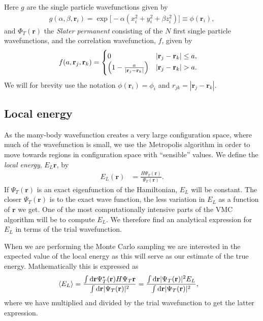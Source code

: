\documentclass[
    a4paper, aps, twocolumn, floatfix, superscriptaddress, nofootinbib]{revtex4-1}
\newcommand{\vf}{\mathbf}
\newcommand{\1}{\mathds{1}}
\begin{document}
    Here $g$ are the single particle wavefunctions given by
    \begin{align}
        g(\alpha, \beta, \vf{r}_i)
        = \exp\bigl[
            -\alpha(x_i^2 + y_i^2 + \beta z_i^2)
        \bigr] \equiv \phi(\vf{r}_i),
    \end{align}
    and $\Phi_T(\vf{r})$ the \textit{Slater permanent} consisting of the $N$
    first single particle wavefunctions, and the correlation wavefunction, $f$,
    given by
    \begin{align}
        f(a, \vf{r}_j, \vf{r}_k)
        &=
        \begin{cases}
            0 & |\vf{r}_j - \vf{r}_k| \leq a, \\
            \Bigl(
                1 - \frac{a}{|\vf{r}_j - \vf{r}_k|}
            \Bigr) & |\vf{r}_j - \vf{r}_k| > a.
        \end{cases}
    \end{align}
    We will for brevity use the notation $\phi(\vf{r}_i) = \phi_i$ and $r_{jk} =
    |\vf{r}_j - \vf{r}_k|$.

    \subsection{Local energy}
        As the many-body wavefunction creates a very large configuration space,
        where much of the wavefunction is small, we use the Metropolis algorithm
        in order to move towards regions in configuration space with
        ``sensible'' values. We define the \textit{local energy}, $E_L{\vf{r}}$,
        by
        \begin{align}
            E_L(\vf{r})
            &= \frac{H\Psi_T(\vf{r})}{\Psi_T(\vf{r})}.
        \end{align}
        If $\Psi_T(\vf{r})$ is an exact eigenfunction of the Hamiltonian, $E_L$
        will be constant. The closer $\Psi_T(\vf{r})$ is to the exact wave
        function, the less variation in $E_L$ as a function of $\vf{r}$ we get.
        One of the most computationally intensive parts of the VMC algorithm
        will be to compute $E_L$. We therefore find an analytical expression for
        $E_L$ in terms of the trial wavefunction.

        When we are performing the Monte Carlo sampling we are interested in the
        expected value of the local energy as this will serve as our estimate of
        the true energy. Mathematically this is expressed as
        \begin{align}
            \expval{E_L}
            &=
            \frac{\int\dd \vf{r}\Psi_T^{*}(\vf{r})H\Psi_T{\vf{r}}}
            {\int\dd \vf{r}|\Psi_T(\vf{r})|^2}
            =
            \frac{
                \int\dd \vf{r}|\Psi_T(\vf{r})|^2 E_L
            }{
                \int\dd \vf{r}|\Psi_T(\vf{r})|^2
            },
        \end{align}
        where we have multiplied and divided by the trial wavefunction to get
        the latter expression.
\end{document}
